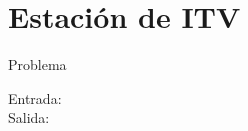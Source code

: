 \section{Estación de ITV}

\begin{frame}{Problema}

\begin{description}
 \item[Entrada:] %
 \item[Salida:] %
\end{description}
\end{frame}

